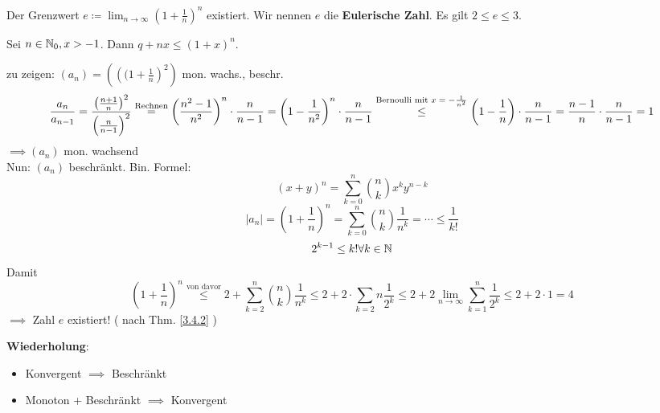 \documentclass[consecutivenumbering]{gadsescript}
\begin{document}
\begin{subcorollary}
	Der Grenzwert $ e \coloneqq \lim_{n\to\infty} ( 1 + \frac{1}{n} )^n $ existiert.
	Wir nennen $ e $ die \textbf{Eulerische Zahl}. Es gilt $ 2\leq e \leq 3 $.
\end{subcorollary}
\begin{sublemma}
	Sei $n \in \mathbb{N}_0, x > -1$. Dann $ q + nx \leq ( 1 + x ) ^n $.
\end{sublemma}
\begin{subproof*}
	zu zeigen: $ (a_n) = \left( \left(( 1 + \frac{1}{n} \right)^2\right) $ mon. wachs., beschr.
	\[ \frac{a_n}{a_{n-1}} = \frac{\left( \frac{n+1}{n}\right)^2}{\left(\frac{n}{n-1} \right)^2} \overset{\text{Rechnen}}{=} \left( \frac{n^2-1}{n^2} \right)^n \cdot \frac{n}{n-1} = \left( 1 - \frac{1}{n^2} \right)^n \cdot \frac{n}{n-1} \overset{\text{Bernoulli mit $ x = -\frac{1}{n^2}$}}{\leq} \left( 1 - \frac{1}{n} \right) \cdot \frac{n}{n-1} = \frac{n-1}{n} \cdot \frac{n}{n-1} = 1 \] 
	$\implies ( a_n ) $ mon. wachsend\\
	Nun: $(a_n)$ beschränkt. Bin. Formel:
	\[( x + y )^n = \sum_{k=0}^{n} \binom{n}{k} x^ky^{n-k}\]
	\[ |a_n| = \left( 1 + \frac{1}{n} \right)^n = \sum_{k=0}^{n} \binom{n}{k}\frac{1}{n^k} = \dotsb \leq \frac{1}{k!}\]
	\[ 2^{k-1} \leq k! \forall k \in \mathbb{N} \]
	Damit
	\[ \left(1+\frac{1}{n} \right)^n \overset{\text{von davor}}{\leq} 2 + \sum_{k=2}^{n} \binom{n}{k}\frac{1}{n^k} \leq 2 + 2 \cdot \sum_{k=2}{n}\frac{1}{2^k} \leq 2 + 2\lim_{n\to\infty} \sum_{k=1}^{n}\frac{1}{2^k} \leq 2 + 2 \cdot 1 = 4 \]
	$\implies$ Zahl $e$ existiert! ( nach Thm. \ref{3.4.2} ) 
\end{subproof*}

\textbf{Wiederholung}:
\begin{itemize}
	\item Konvergent $\implies$ Beschränkt
	\item Monoton + Beschränkt $\implies$ Konvergent
\end{itemize}
\end{document}
